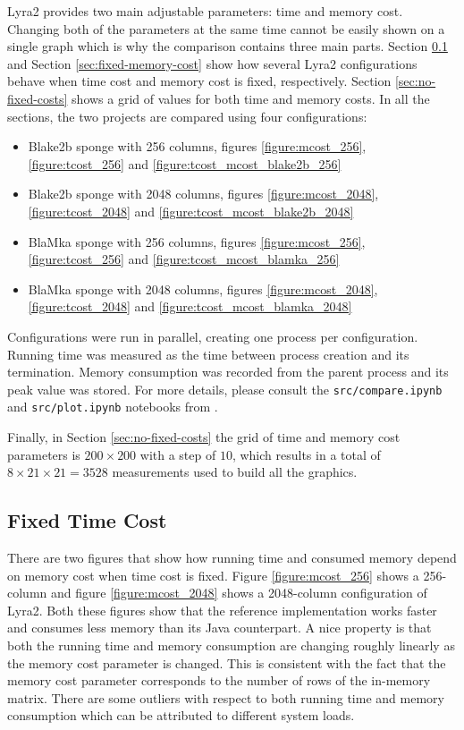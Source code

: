 Lyra2 provides two main adjustable parameters: time and memory cost. Changing both of the parameters at the same time cannot be easily shown on a single graph which is why the comparison contains three main parts. Section \ref{sec:fixed-time-cost} and Section \ref{sec:fixed-memory-cost} show how several Lyra2 configurations behave when time cost and memory cost is fixed, respectively. Section \ref{sec:no-fixed-costs} shows a grid of values for both time and memory costs. In all the sections, the two projects are compared using four configurations:

\begin{itemize}
    \item Blake2b sponge with 256 columns, figures \ref{figure:mcost_256}, \ref{figure:tcost_256} and \ref{figure:tcost_mcost_blake2b_256}
    \item Blake2b sponge with 2048 columns, figures \ref{figure:mcost_2048}, \ref{figure:tcost_2048} and \ref{figure:tcost_mcost_blake2b_2048}
    \item BlaMka sponge with 256 columns, figures \ref{figure:mcost_256}, \ref{figure:tcost_256} and \ref{figure:tcost_mcost_blamka_256}
    \item BlaMka sponge with 2048 columns, figures \ref{figure:mcost_2048}, \ref{figure:tcost_2048} and \ref{figure:tcost_mcost_blamka_2048}
  \end{itemize}

Configurations were run in parallel, creating one process per configuration. Running time was measured as the time between process creation and its termination. Memory consumption was recorded from the parent process and its peak value was stored. For more details, please consult the \texttt{src/compare.ipynb} and \texttt{src/plot.ipynb} notebooks from \cite{github:2017:lyra2-compare}.

Finally, in Section \ref{sec:no-fixed-costs} the grid of time and memory cost parameters is \(200 \times 200\) with a step of \(10\), which results in a total of \(8 \times 21 \times 21 = 3528\) measurements used to build all the graphics.

\subsection{Fixed Time Cost}
\label{sec:fixed-time-cost}

There are two figures that show how running time and consumed memory depend on memory cost when time cost is fixed. Figure \ref{figure:mcost_256} shows a 256-column and figure \ref{figure:mcost_2048} shows a 2048-column configuration of Lyra2. Both these figures show that the reference implementation works faster and consumes less memory than its Java counterpart. A nice property is that both the running time and memory consumption are changing roughly linearly as the memory cost parameter is changed. This is consistent with the fact that the memory cost parameter corresponds to the number of rows of the in-memory matrix. There are some outliers with respect to both running time and memory consumption which can be attributed to different system loads.

